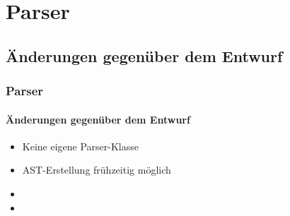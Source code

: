 \section{Parser}

\subsection{Änderungen gegenüber dem Entwurf}
\begin{frame}
\frametitle{Parser}
\framesubtitle{Änderungen gegenüber dem Entwurf}
\begin{itemize}
	\item<+-> Keine eigene Parser-Klasse
	\item<+-> AST-Erstellung frühzeitig möglich
	\item<+-> 
	\item<+-> 
\end{itemize}
\end{frame}

